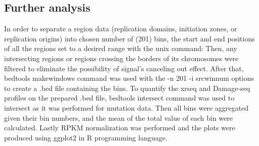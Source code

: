 \subsection{Further analysis}
In order to separate a region data (replication domains, initiation zones, or replication origins) into chosen number of (201) bins, the start and end positions of all the regions set to a desired range with the unix command: %
Then, any intersecting regions or regions crossing the borders of its chromosomes were filtered to eliminate the possibility of signal's canceling out effect. After that, bedtools makewindows command was used with the -n 201 -i srcwinnum options to create a .bed file containing the bins.
To quantify the \gls{xrseq} and Damage-seq profiles on the prepared .bed file, bedtools intersect command was used to intersect as it was performed for mutation data. Then all bins were aggregated given their bin numbers, and the mean of the total value of each bin were calculated. Lastly RPKM normalization was performed and the plots were produced using ggplot2 in R programming language.